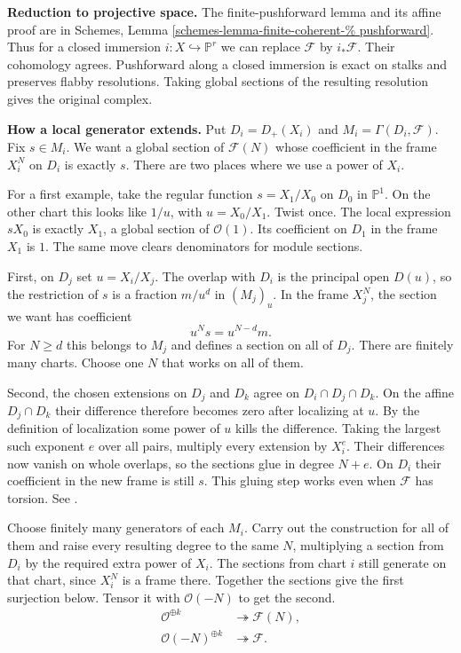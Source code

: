 \medskip\noindent
\textbf{Reduction to projective space.}
The finite-pushforward lemma and its affine
proof are in Schemes, Lemma
\ref{schemes-lemma-finite-coherent-%
pushforward}.
Thus for a closed immersion
$i:X\hookrightarrow\mathbb P^r$ we can
replace $\mathcal F$ by $i_*\mathcal F$.
Their cohomology agrees. Pushforward along a
closed immersion is exact on stalks and
preserves flabby resolutions. Taking global
sections of the resulting resolution gives
the original complex.

\medskip\noindent
\textbf{How a local generator extends.}
Put $D_i=D_+(X_i)$ and
$M_i=\Gamma(D_i,\mathcal F)$. Fix $s\in M_i$.
We want a global section of $\mathcal F(N)$
whose coefficient in the frame $X_i^N$ on
$D_i$ is exactly $s$. There are two places
where we use a power of $X_i$.

For a first example, take the regular
function $s=X_1/X_0$ on $D_0$ in
$\mathbb P^1$. On the other chart this
looks like $1/u$, with $u=X_0/X_1$.
Twist once. The local expression $sX_0$
is exactly $X_1$, a global section of
$\mathcal O(1)$. Its coefficient on $D_1$
in the frame $X_1$ is $1$. The same move
clears denominators for module sections.

First, on $D_j$ set $u=X_i/X_j$. The overlap
with $D_i$ is the principal open $D(u)$, so
the restriction of $s$ is a fraction $m/u^d$
in $(M_j)_u$. In the frame $X_j^N$, the
section we want has coefficient
$$
u^N s=u^{N-d}m .
$$
For $N\ge d$ this belongs to $M_j$ and
defines a section on all of $D_j$. There are
finitely many charts. Choose one $N$ that
works on all of them.

Second, the chosen extensions on $D_j$ and
$D_k$ agree on $D_i\cap D_j\cap D_k$. On the
affine $D_j\cap D_k$ their difference
therefore becomes zero after localizing at
$u$. By the definition of localization some
power of $u$ kills the difference. Taking the
largest such exponent $e$ over all pairs,
multiply every extension by $X_i^e$. Their
differences now vanish on whole overlaps, so
the sections glue in degree $N+e$. On $D_i$
their coefficient in the new frame is still
$s$. This gluing step works even when
$\mathcal F$ has torsion. See
\cite[II, Lemma 5.14]{har}.

Choose finitely many generators of each
$M_i$. Carry out the construction for all of
them and raise every resulting degree to the
same $N$, multiplying a section from $D_i$ by
the required extra power of $X_i$. The
sections from chart $i$ still generate on
that chart, since $X_i^N$ is a frame there.
Together the sections give the first
surjection below. Tensor it with $\mathcal
O(-N)$ to get the second.
$$
\begin{aligned}
\mathcal O^{\oplus k}
&\twoheadrightarrow\mathcal F(N),\\
\mathcal O(-N)^{\oplus k}
&\twoheadrightarrow\mathcal F .
\end{aligned}
$$

